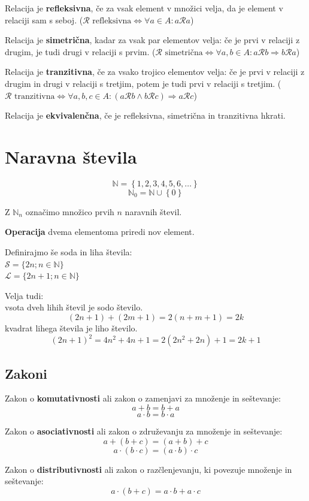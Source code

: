 \documentclass[a4paper,oneside,12pt,fleqn]{article}
\def\N{\ensuremath{\mathbb N}}
\newcommand\krat\cdot
\newcommand{\Rel}{\mathcal{R}}
\renewcommand\implies\Rightarrow
\renewcommand\iff\Leftrightarrow
\numberwithin{equation}{section}
\begin{document}
Relacija je \textbf{refleksivna}, če za vsak element v množici velja, da je element v relaciji sam s
seboj. ($\Rel \text{ refleksivna} \iff \forall a \in A\!: a \Rel a$)

Relacija je \textbf{simetrična}, kadar za vsak par elementov velja: če je prvi v relaciji z drugim,
je tudi drugi v relaciji s prvim. 
($\Rel \text{ simetrična} \iff \forall a, b \in A\!: a \Rel b \implies b \Rel a$)

Relacija je \textbf{tranzitivna}, če za vsako trojico elementov velja: če je prvi v relaciji z
drugim in drugi v relaciji s tretjim, potem je tudi prvi v relaciji s tretjim.
($\Rel \text{ tranzitivna} \iff \forall a, b, c \in A\!: (a \Rel b \land b \Rel c) \implies a \Rel c$)

Relacija je \textbf{ekvivalenčna}, če je refleksivna, simetrična in tranzitivna hkrati.

\section{Naravna števila}
\label{sec:naravna}
\[ \N = \left\{1, 2, 3, 4, 5, 6, \ldots \right\} \]
\[ \N_0 = \N \cup \left\{ 0 \right\} \]

Z $\N_n$ označimo množico prvih $n$ naravnih števil.

\textbf{Operacija} dvema elementoma priredi nov element.

Definirajmo še soda in liha števila: \\
$\mathcal S = \{2n; n \in \N \}$ \\
$\mathcal L = \{2n+1; n \in \N \}$

Velja tudi: \\
vsota dveh lihih števil je sodo število. 
\[ (2n+1) + (2m+1) = 2(n+m+1) = 2k \]
kvadrat lihega števila je liho število. 
\[ (2n+1)^2 = 4n^2 + 4n + 1 = 2(2n^2 + 2n) + 1 = 2k+1 \]

\subsection{Zakoni}
\label{sec:naravna:zakoni}
Zakon o \textbf{komutativnosti} ali zakon o zamenjavi za množenje in seštevanje:
\[ a + b =  b + a \]
\[ a \krat b =  b \krat a \]

Zakon o \textbf{asociativnosti} ali zakon o združevanju za množenje in seštevanje:
\[ a + (b + c) = (a + b) + c \]
\[ a \krat (b \krat c) = (a \krat b) \krat c \]

Zakon o \textbf{distributivnosti} ali zakon o razčlenjevanju, ki povezuje množenje in seštevanje:
\[ a \krat (b + c) = a \krat b + a \krat c \]
\end{document}
